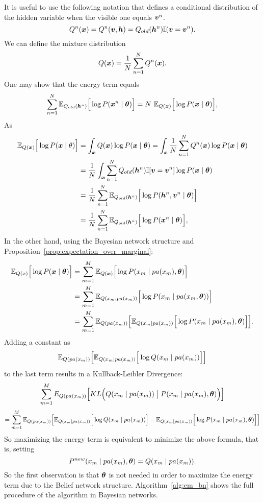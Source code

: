 It is useful to use the following notation that defines a conditional distribution of the hidden variable when the visible one equals \(\bm{v}^{n}\).
\[
  Q^{n}(\bm{x}) = Q^{n}(\bm{v},\bm{h}) = Q_{old}(\bm{h}^{n}) \mathbb{I}(\bm{v} = \bm{v}^{n}).
\]
We can define the mixture distribution
\[
  Q(\bm{x}) = \frac{1}{N}\sum_{n = 1}^{N}Q^{n}(\bm{x}).
\]
One may show that the energy term equals
\[
  \sum_{n = 1}^{N}\E{Q_{old}(\bh^n)}{\log{P(\bx^{n} \mid \btheta)}} = N \ \E{Q(\bx)}{\log{P(\bx \mid \btheta)}},
\]
As
\[
  \begin{aligned}
    \mathbb{E}_{Q(\bm{x})}\Big[\log{P(\bm{x}\mid \theta)}\Big] &= \int_{\bm{x}}Q(\bm{x})\log{P(\bm{x}\mid \bm{\theta})} =  \int_{\bm{x}} \frac{1}{N}\sum_{n=1}^{N}Q^{n}(\bm{x})\log{P(\bm{x}\mid \bm{\theta})} \\
    &= \frac{1}{N} \int_{\bm{x}}\sum_{n=1}^{N}Q_{old}(\bm{h}^n)\mathbb{I}[\bm{v} = \bm{v}^{n}]\log{P(\bm{x}\mid \bm{\theta})}\\
    &= \frac{1}{N}\sum_{n = 1}^{N}\mathbb{E}_{Q_{old}(\bm{h}^n)}\Big[\log{P(\bm{h}^n, \bm{v}^{n} \mid \bm{\theta})}\Big]\\
    &= \frac{1}{N}\sum_{n = 1}^{N}\mathbb{E}_{Q_{old}(\bm{h}^n)}\Big[\log{P(\bm{x}^{n} \mid \bm{\theta})}\Big],
  \end{aligned}
\]
In the other hand, using the Bayesian network structure and Proposition~\ref{prop:expectation_over_marginal}:
\[
  \begin{aligned}
    \mathbb{E}_{Q(x)}\Big[\log{P(\bm{x}\mid \bm{\theta})}\Big] &= \sum_{m = 1}^{M}\mathbb{E}_{Q(\bm{x})}\Big[\log{P(x_{m} \mid pa(x_{m}), \bm{\theta})}\Big]\\
    &= \sum_{m = 1}^{M}\mathbb{E}_{Q(x_{m}, pa(x_{m}))}\Big[\log{P(x_{m} \mid pa(x_{m}, \bm{\theta}))}\Big]\\
    &= \sum_{m = 1}^{M}\mathbb{E}_{Q(pa(x_{m}))}\Big[ \mathbb{E}_{Q(x_{m}\mid pa(x_{m}))}\Big[ \log{P(x_{m} \mid pa(x_{m}), \bm{\theta})}\Big]\Big].
\end{aligned}
\]
Adding a constant as
\[
  \mathbb{E}_{Q(pa(x_{m}))}\Big[\mathbb{E}_{Q(x_{m}\mid pa(x_{m}))}\Big[\log{Q(x_{m} \mid pa(x_{m}))}\Big]\Big]
\]
to the last term results in a Kullback-Leibler Divergence:
\[
  \sum_{m = 1}^{M} E_{Q(pa(x_{m}))} \Big[ KL\Big(Q(x_{m}\mid pa(x_{m})) \bigm| P(x_{m} \mid pa(x_{m}), \bm{\theta})\Big)\Big]
\]
\[
  =\sum_{m = 1}^{M}\mathbb{E}_{Q(pa(x_{m}))}\Big[\mathbb{E}_{Q(x_{m}\mid pa(x_{m}))}\Big[\log{Q(x_{m} \mid pa(x_{m}))}\Big] - \mathbb{E}_{Q(x_{m}\mid pa(x_{m}))}\Big[\log{P(x_{m} \mid pa(x_{m}), \bm{\theta})}\Big]\Big]
\]
So maximizing the energy term is equivalent to minimize the above formula, that is, setting
\[
  P^{new}(x_{m} \mid pa(x_{m}), \bm{\theta}) = Q(x_{m} \mid pa(x_{m})).
\]
So the first observation is that \(\bm{\theta}\) is not needed in order to maximize the energy term due to the Belief network structure. Algorithm~\ref{alg:em_bn} shows the full procedure of the algorithm in Bayesian networks.


